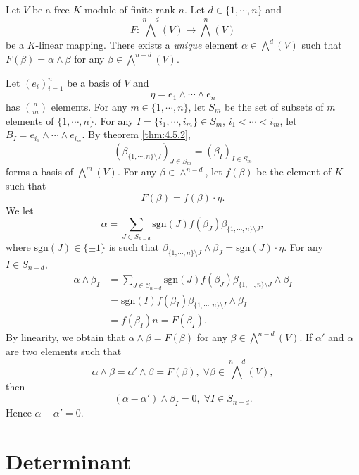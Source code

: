 \begin{corollaryenv}\label{thm:4.5.3}
    Let $V$ be a free $K$-module of finite rank $n$.
    Let $d \in \{1,\cdots,n\}$ and 
    $$ F: \bigwedge^{n-d} (V) \longrightarrow \bigwedge^n (V)$$
    be a $K$-linear mapping.
    There exists a \textit{unique} element $\alpha\in \bigwedge^d (V)$ such that $F(\beta) = \alpha \wedge \beta$ for any $\beta \in \bigwedge^{n-d} (V)$.
\end{corollaryenv}
\begin{proofenv}
    Let $\left(e_i\right)_{i=1}^{n}$ be a basis of $V$ and
    $$ \eta = e_1 \wedge \cdots \wedge e_n$$
    has $\binom{n}{m}$ elements.
    For any $m\in \{1,\cdots, n\}$, let $S_m$ be the set of subsets of $m$ elements of $\{1,\cdots,n\}$.
    For any $I = \{i_1,\cdots, i_m\}\in S_m$, $i_1<\cdots<i_m$, let $B_I = e_{i_1} \wedge \cdots \wedge e_{i_m}$.
    By theorem \ref{thm:4.5.2},
    $$ \left(\beta_{\{1,\cdots,n\}\setminus J}\right)_{J \in S_{m}} = \left(\beta_I\right)_{I \in S_m}$$
    forms a basis of $\bigwedge^m (V)$.
    For any $\beta \in \wedge^{n-d}$, let $f(\beta)$ be the element of $K$ such that 
    $$ F(\beta) = f(\beta) \cdot\eta.$$
    We let 
    $$ \alpha = \sum_{J \in S_{n-d}} \mathrm{sgn} (J) f(\beta_J) \beta_{\{1,\cdots,n\}\setminus J},$$
    where $\mathrm{sgn}(J) \in \{\pm 1\}$ is such that $\beta_{\{1,\cdots,n\}\setminus J} \wedge \beta_J = \mathrm{sgn}(J) \cdot \eta$.
    For any $I \in S_{n-d}$,
    $$\begin{array}{rl}
        \alpha \wedge \beta_{I} &= \sum_{J \in S_{n-d}} \mathrm{sgn} (J) f(\beta_J) \beta_{\{1,\cdots,n\}\setminus J} \wedge \beta_{I}\\
        & = \mathrm{sgn}(I) f(\beta_I) \beta_{\{1,\cdots,n\}\setminus I} \wedge \beta_I \\
        & = f(\beta_I) n = F(\beta_I).
    \end{array}$$
    By linearity, we obtain that $\alpha\wedge \beta = F(\beta)$ for any $\beta \in \bigwedge^{n-d} (V)$.
    If $\alpha'$ and $\alpha$ are two elements such that 
    $$ \alpha \wedge \beta = \alpha' \wedge \beta = F(\beta),\; \forall \beta \in \bigwedge^{n-d} (V),$$
    then
    $$ \left(\alpha - \alpha'\right) \wedge \beta_{I} = 0,\; \forall I \in S_{n-d}.$$
    Hence $\alpha - \alpha' = 0$.
\end{proofenv}


\section{Determinant}

